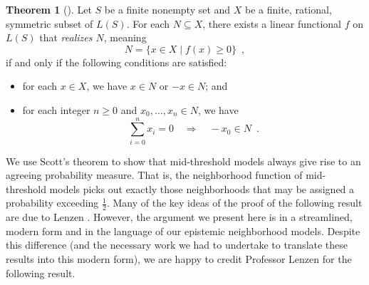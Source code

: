 \documentclass[12pt]{article}
\theoremstyle{definition}
\newtheorem{theorem}{Theorem}[section]
\begin{document}
\begin{theorem}[{\cite[Theorem 1.2]{Sco64:JMP}}]
  \label{theorem:scott}
  Let $S$ be a finite nonempty set and $X$ be a finite, rational,
  symmetric subset of $L(S)$. For each $N\subseteq X$, there exists a
  linear functional $f$ on $L(S)$ that \emph{realizes $N$}, meaning
  \[
  N = \{x\in X\mid f(x)\geq 0\}\enspace,
  \]
  if and only if the following conditions are satisfied:
  \begin{itemize}
  \item for each $x\in X$, we have $x\in N$ or $-x\in N$; and

  \item for each integer $n\geq 0$ and $x_0,\dots,x_n\in N$, we have
  \[
  \sum_{i=0}^n x_i = 0
  \quad\Rightarrow\quad
  -x_0\in N\enspace.
  \]
  \end{itemize}
\end{theorem}

We use Scott's theorem to show that mid-threshold models always give
rise to an agreeing probability measure.  That is, the neighborhood
function of mid-threshold models picks out exactly those neighborhoods
that may be assigned a probability exceeding $\frac 12$.  Many of the
key ideas of the proof of the following result are due to Lenzen
\cite{Lenzen1980:gwuw}. However, the argument we present here is in a
streamlined, modern form and in the language of our epistemic
neighborhood models. Despite this difference (and the necessary work
we had to undertake to translate these results into this modern form),
we are happy to credit Professor Lenzen for the following result.
\end{document}
